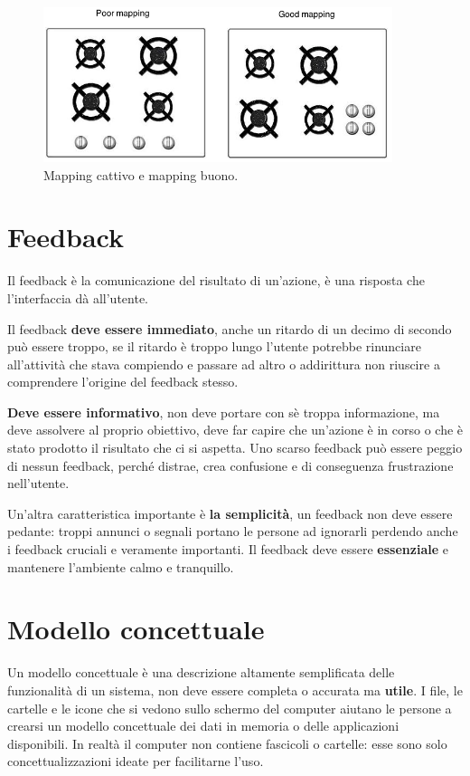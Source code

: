 \begin{figure}[!h]
	\centering
	\includegraphics[scale = 0.7]{immagini/mapping.png}
	\caption{Mapping cattivo e mapping buono.}
\end{figure}

\pagebreak

\section{Feedback}
Il feedback è la comunicazione del risultato di un'azione, è una risposta che l'interfaccia dà all'utente.

Il feedback \textbf{deve essere immediato}, anche un ritardo di un decimo di secondo può essere troppo, se il ritardo è troppo lungo l'utente potrebbe rinunciare all'attività che stava compiendo e passare ad altro o addirittura non riuscire a comprendere l'origine del feedback stesso.

\textbf{Deve essere informativo}, non deve portare con sè troppa informazione, ma deve assolvere al proprio obiettivo, deve far capire che un'azione è in corso o che è stato prodotto il risultato che ci si aspetta. Uno scarso feedback può essere peggio di nessun feedback, perché distrae, crea confusione e di conseguenza frustrazione nell'utente.

Un'altra caratteristica importante è \textbf{la semplicità}, un feedback non deve essere pedante: troppi annunci o segnali portano le persone ad ignorarli perdendo anche i feedback cruciali e veramente importanti. Il feedback deve essere \textbf{essenziale} e mantenere l'ambiente calmo e tranquillo.

\section{Modello concettuale}
Un modello concettuale è una descrizione altamente semplificata delle funzionalità di un sistema, non deve essere completa o accurata ma \textbf{utile}. I file, le cartelle e le icone che si vedono sullo schermo del computer aiutano le persone a crearsi un modello concettuale dei dati in memoria o delle applicazioni disponibili. In realtà il computer non contiene fascicoli o cartelle: esse sono solo concettualizzazioni ideate per facilitarne l'uso.

